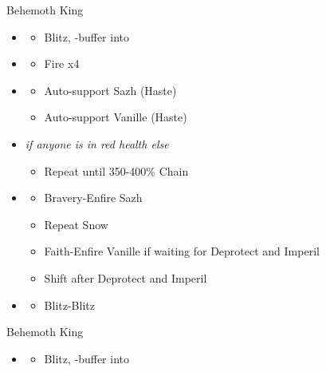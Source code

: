\begin{paracol}{2}
\begin{battle}{Behemoth King}
	\begin{itemize}
		\item \second
		      \begin{itemize}
			      \item Blitz, \rav-buffer into
		      \end{itemize}
		\item \sixth
		      \begin{itemize}
			      \item Fire x4
		      \end{itemize}
		\item \fourth
		      \begin{itemize}
			      \item Auto-support Sazh (Haste)
			      \item Auto-support Vanille (Haste)
		      \end{itemize}
		\item \fifth \textit{if anyone is in red health else} \sixth
		      \begin{itemize}
			      \item Repeat until 350-400\% Chain
		      \end{itemize}
		\item \third
		      \begin{itemize}
			      \item Bravery-Enfire Sazh
			      \item Repeat Snow
			      \item Faith-Enfire Vanille if waiting for Deprotect and Imperil
			      \item Shift after Deprotect and Imperil
		      \end{itemize}
		\item \second
		      \begin{itemize}
			      \item Blitz-Blitz
		      \end{itemize}
	\end{itemize}
\end{battle}
\switchcolumn
\begin{battle}{Behemoth King}
	\begin{itemize}
		\item \second
		      \begin{itemize}
			      \item Blitz, \rav-buffer into
		      \end{itemize}

\end{itemize}
\end{battle}
\end{paracol}
